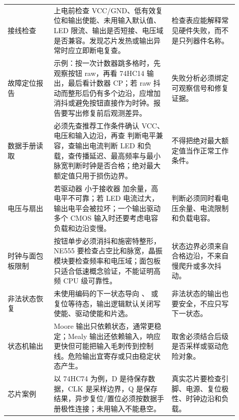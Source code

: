 \begin{longtable}{L{0.18\linewidth}L{0.46\linewidth}L{0.26\linewidth}}
接线检查 & 上电前检查 VCC/GND、低有效复位和输出使能、未用输入默认值、LED 限流、输出是否短接、电压域是否兼容。发现芯片发热或输出异常时应立即断电复查。 & 检查表应能解释常见硬件失败，而不是只列器件名称。 \\
故障定位报告 & 示例：按一次计数器跳多格时，先观察按钮 raw，再看 74HC14 输出，最后看计数器 CP；若 raw 抖动而整形后仍有多个边沿，应增加消抖或避免按钮直接作为时钟。报告要写出修复前后观测差异。 & 失败分析必须绑定可观察信号和修复证据。 \\
数据手册读取 & 必须先查推荐工作条件确认 VCC、电压和输入边沿，再查  判断电平兼容，查输出电流判断 LED 和负载，查传播延迟、最高频率与最小脉宽判断时钟是否合格；绝对最大额定值只用于损伤边界。 & 不得把绝对最大额定值当作正常工作条件。 \\
电压与扇出 & 若驱动器  小于接收器  加余量，高电平不可靠；若 LED 电流过大，输出电平会被拉坏；一个输出驱动多个 CMOS 输入时还要考虑电容负载和边沿变慢。 & 判断必须同时看电压余量、电流限制和负载电容。 \\
时钟与面包板限制 & 按钮单步必须消抖和施密特整形，NE555 要检查占空比和脉宽，晶振模块要检查频率和电压域；面包板只适合低速概念验证，不能证明高频 CPU 级可靠性。 & 状态边界必须来自合格边沿，不来自慢爬升或多次抖动。 \\
非法状态恢复 & 未使用编码的下一状态导向 、 或复位等待态，输出逻辑默认关闭写使能、驱动使能和片选。 & 非法状态的输出也要安全，不应只写下一状态。 \\
状态机输出 & Moore 输出只依赖状态，通常更稳定；Mealy 输出还依赖输入，响应更快但可能把输入毛刺传到控制线。危险输出宜寄存或只由稳定状态产生。 & 取舍必须结合后级是否采样或驱动危险对象。 \\
芯片案例 & 以 74HC74 为例，D 是待保存数据，CLK 是采样边界，Q 是保存结果，异步复位/置位必须按数据手册极性连接；未用输入不能悬空。 & 真实芯片要检查引脚、电源、复位极性、时钟边沿和负载。 \\
\bottomrule
\end{longtable}

